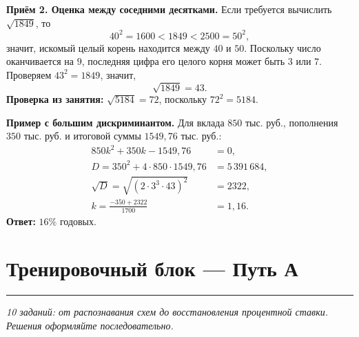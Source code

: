 \documentclass[a4paper,11pt]{article}
\newcommand{\key}[1]{\textcolor{darkaccent}{\textbf{#1}}}
\begin{document}
\textbf{Приём 2. Оценка между соседними десятками.} Если требуется вычислить $\sqrt{1849}$, то
\[
40^2=1600<1849<2500=50^2,
\]
значит, искомый целый корень находится между $40$ и $50$. Поскольку число оканчивается на $9$, последняя цифра его целого корня может быть $3$ или $7$. Проверяем $43^2=1849$, значит,
\[
\boxed{\sqrt{1849}=43}.
\]
\textbf{Проверка из занятия:} $\sqrt{5184}=72$, поскольку $72^2=5184$.

\textbf{Пример с большим дискриминантом.} Для вклада $850$ тыс. руб., пополнения $350$ тыс. руб. и итоговой суммы $1549{,}76$ тыс. руб.:
\[
\begin{aligned}
850k^2+350k-1549{,}76&=0,\\
D=350^2+4\cdot850\cdot1549{,}76&=5\,391\,684,\\
\sqrt D=\sqrt{(2\cdot3^3\cdot43)^2}&=2322,\\
k=\frac{-350+2322}{1700}&=1{,}16.
\end{aligned}
\]
\key{Ответ:} $16\%$ годовых.

\clearpage
\section*{Тренировочный блок --- Путь А}
\noindent\textcolor{accent}{\rule{\linewidth}{0.45pt}}
\textit{10 заданий: от распознавания схем до восстановления процентной ставки. Решения оформляйте последовательно.}
\end{document}
